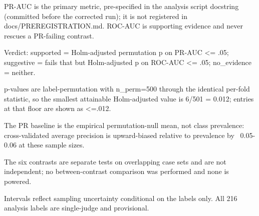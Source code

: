 \begin{table}[t]
\begin{threeparttable}
\begin{tablenotes}[flushleft]
\item PR-AUC is the primary metric, pre-specified in the analysis script docstring (committed before the corrected run); it is not registered in docs/PREREGISTRATION.md. ROC-AUC is supporting evidence and never rescues a PR-failing contrast.
\item Verdict: supported = Holm-adjusted permutation p on PR-AUC <= .05; suggestive = fails that but Holm-adjusted p on ROC-AUC <= .05; no\_evidence = neither.
\item p-values are label-permutation with n\_perm=500 through the identical per-fold statistic, so the smallest attainable Holm-adjusted value is 6/501 = 0.012; entries at that floor are shown as <=.012.
\item The PR baseline is the empirical permutation-null mean, not class prevalence: cross-validated average precision is upward-biased relative to prevalence by ~0.05-0.06 at these sample sizes.
\item The six contrasts are separate tests on overlapping case sets and are not independent; no between-contrast comparison was performed and none is powered.
\item Intervals reflect sampling uncertainty conditional on the labels only. All 216 analysis labels are single-judge and provisional.
\end{tablenotes}
\end{threeparttable}
\end{table}
